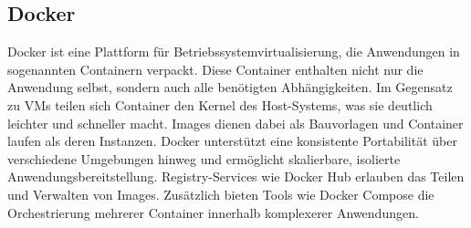 \subsection{Docker}
Docker ist eine Plattform für Betriebssystemvirtualisierung, die Anwendungen in sogenannten Containern verpackt. Diese Container enthalten nicht nur die Anwendung selbst, sondern auch alle benötigten Abhängigkeiten. Im Gegensatz zu VMs teilen sich Container den Kernel des Host-Systems, was sie deutlich leichter und schneller macht. Images dienen dabei als Bauvorlagen und Container laufen als deren Instanzen. Docker unterstützt eine konsistente Portabilität über verschiedene Umgebungen hinweg und ermöglicht skalierbare, isolierte Anwendungsbereitstellung. Registry-Services wie Docker Hub erlauben das Teilen und Verwalten von Images. Zusätzlich bieten Tools wie Docker Compose die Orchestrierung mehrerer Container innerhalb komplexerer Anwendungen. \autocite{docker}
